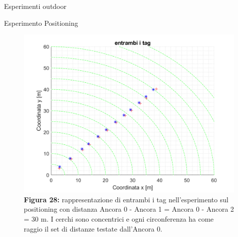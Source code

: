 \documentclass[12pt]{report}
\begin{document}
\begin{section}{Esperimenti outdoor}
\begin{subsection}{Esperimento Positioning}
			\begin{figure}[H]
				\centering
				\includegraphics[scale=0.45]{EspOutPos30}
	 			\caption{\textbf{Figura 28:} rappresentazione di entrambi i tag nell'esperimento sul positioning con distanza Ancora 0 - Ancora 1 = Ancora 0 - Ancora 2 = 30 m. I cerchi sono concentrici e ogni circonferenza ha come raggio il set di distanze testate dall'Ancora 0.\label{EspOutPos30}}
			\end{figure}


\end{subsection}
\end{section}
\end{document}
